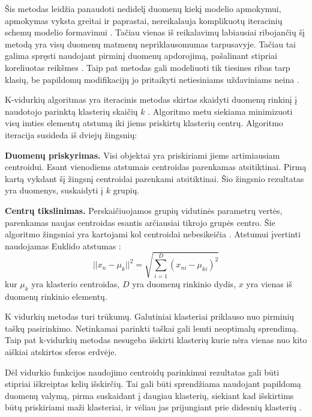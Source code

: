   Šis metodas leidžia panaudoti nedidelį duomenų kiekį modelio apmokymui, apmokymas vyksta greitai ir paprastai, nereikalauja komplikuotų iteracinių schemų modelio formavimui \cite{Wu2008}. Tačiau vienas iš reikalavimų labiausiai ribojančių šį metodą yra visų duomenų matmenų nepriklausomumas tarpusavyje. Tačiau tai galima spręsti naudojant pirminį duomenų apdorojimą, pašalinant stipriai koreliuotas reikšmes \cite{Wu2008}. Taip pat metodas gali modeliuoti tik tiesines ribas tarp klasių, be papildomų modifikacijų jo pritaikyti netiesiniams uždaviniams neina \cite{comp}.

 K-vidurkių algoritmas yra iteracinis metodas skirtas skaidyti duomenų rinkinį į naudotojo parinktą klasterių skaičių $k$ \cite{Wu2008}. Algoritmo metu siekiama minimizuoti visų imties elementų atstumą iki jiems priskirtų klasterių centrų. Algoritmo iteracija susideda iš dviejų žingsnių:

 \textbf{Duomenų priskyrimas.} Visi objektai yra priskiriami jiems artimiausiam centroidui. Esant vienodiems atstumais centroidas parenkamas atsitiktinai. Pirmą kartą vykdant šį žingsnį centroidai parenkami atsitiktinai. Šio žingsnio rezultatas yra duomenys, suskaidyti į $k$ grupių.

 \textbf{Centrų tikslinimas.} Perskaičiuojamos grupių vidutinės parametrų vertės, parenkamas naujas centroidas esantis arčiausiai tikrojo grupės centro.
 Šie algoritmo žingsniai yra kartojami kol centroidai nebesikeičia \cite{Wu2008}. Atstumui įvertinti naudojamas Euklido atstumas \cite{comp}:
   \begin{equation}
   ||x_n - \mu_k||^2 = \sqrt{\sum_{i=1}^{D}(x_{ni} - \mu_{ki})^2}
   \end{equation}
   kur $\mu_k$ yra klasterio centroidas, $D$ yra duomenų rinkinio dydis, $x$ yra vienas iš duomenų rinkinio elementų.

   K vidurkių metodas turi trūkumų. Galutiniai klasteriai priklauso nuo pirminių taškų pasirinkimo. Netinkamai parinkti taškai gali lemti neoptimalų sprendimą. Taip pat k-vidurkių metodas nesugeba išskirti klasterių kurie nėra vienas nuo kito aiškiai atskirtos sferos erdvėje.

   Dėl vidurkio funkcijos naudojimo centroidų parinkimui rezultatas gali būti stipriai iškreiptas kelių išskirčių. Tai gali būti sprendžiama naudojant papildomą duomenų valymą, pirma suskaidant į daugiau klasterių, siekiant kad išskirtims būtų priskiriami maži klasteriai, ir vėliau jas prijungiant prie didesnių klasterių \cite{Wu2008}.

